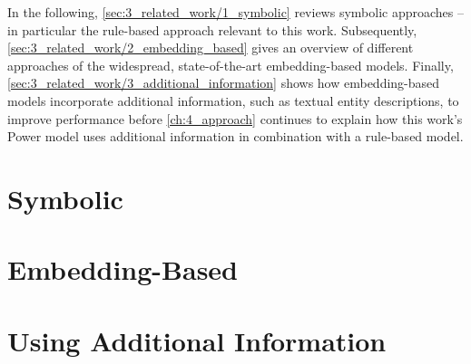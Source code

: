 In the following, \autoref{sec:3_related_work/1_symbolic} reviews symbolic approaches -- in particular the rule-based approach relevant to this work. Subsequently, \autoref{sec:3_related_work/2_embedding_based} gives an overview of different approaches of the widespread, state-of-the-art embedding-based models. Finally, \autoref{sec:3_related_work/3_additional_information} shows how embedding-based models incorporate additional information, such as textual entity descriptions, to improve performance before \autoref{ch:4_approach} continues to explain how this work's Power model uses additional information in combination with a rule-based model.


\section{Symbolic}
\label{sec:3_related_work/1_symbolic}



\section{Embedding-Based}
\label{sec:3_related_work/2_embedding_based}



\section{Using Additional Information}
\label{sec:3_related_work/3_additional_information}

